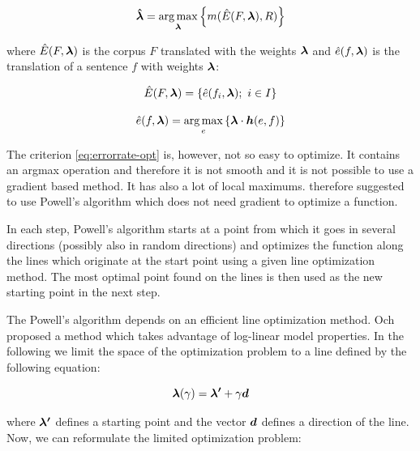 \begin{equation}
  \boldsymbol{\hat\lambda} = \operatorname*{arg\,max}_{\boldsymbol{\lambda}} \left\{ m( \hat{E}(F,
  \boldsymbol{\lambda}), R ) \right\}
    \label{eq:errorrate-opt}
\end{equation}

\noindent where $\hat{E}(F, \boldsymbol{\lambda})$ is the corpus $F$ translated with
the weights $\boldsymbol{\lambda}$ and $\hat{e}(f, \boldsymbol{\lambda})$ is the
translation of a sentence $f$ with weights $\boldsymbol{\lambda}$:

\begin{equation}
  \hat{E}(F, \boldsymbol{\lambda}) = \left\{ \hat{e}(f_i, \boldsymbol{\lambda});~i \in I\right\}
    \label{eq:corpus-translation}
\end{equation}

\begin{equation}
  \hat{e}(f, \boldsymbol{\lambda}) = 
    \operatorname*{arg\,max}_{e} \left\{ \boldsymbol{\lambda} \cdot \boldsymbol{h}(e, f) \right\}
    \label{eq:sentence-translation}
\end{equation}

The criterion \eqref{eq:errorrate-opt} is, however, not so easy to optimize. It
contains an argmax operation and therefore it is not smooth and it is not possible
to use a gradient based method. It has also a lot of local maximums.
 therefore suggested to use Powell's algorithm
 which does not need gradient to optimize a function.

In each step, Powell's algorithm starts at a point from which it goes in
several directions (possibly also in random directions) and optimizes the
function along the lines which originate at the start point using a given line
optimization method. The most optimal point found on the lines is then used as
the new starting point in the next step. 

The Powell's algorithm depends on an efficient line optimization method. Och
proposed a method which takes advantage of log-linear model properties. In the
following we limit the space of the optimization problem to a line defined by
the following equation:

\begin{equation}
  \boldsymbol{\lambda}(\gamma) = \boldsymbol{\lambda'} + \gamma \boldsymbol{d}
  \label{eq:line}
\end{equation}

\noindent where $\boldsymbol{\lambda'}$ defines a starting point and the vector
$\boldsymbol{d}$ defines a direction of the line. Now, we can reformulate the limited
optimization problem:

